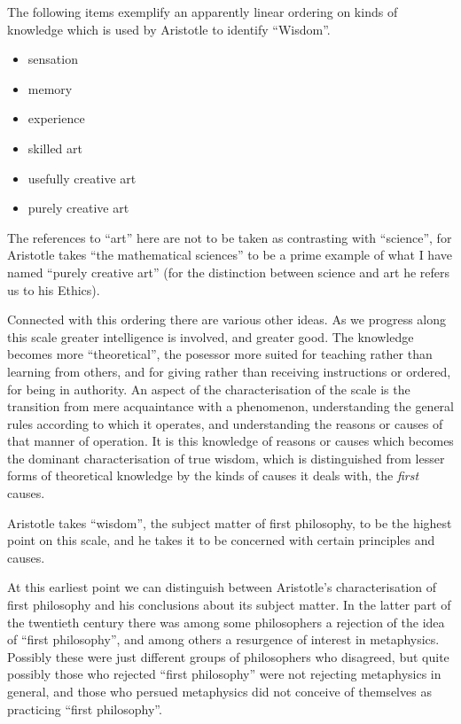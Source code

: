 \documentclass[10pt,titlepage]{article}
\begin{document}
The following items exemplify an apparently linear ordering on kinds of knowledge which is used by Aristotle to identify ``Wisdom''.

\begin{itemize}
\item sensation
\item memory
\item experience
\item skilled art
\item usefully creative art
\item purely creative art
\end{itemize}

The references to ``art'' here are not to be taken as contrasting with ``science'', for Aristotle takes ``the mathematical sciences'' to be a prime example of what I have named ``purely creative art'' (for the distinction between science and art he refers us to his Ethics).

Connected with this ordering there are various other ideas.
As we progress along this scale greater intelligence is involved, and greater good.
The knowledge becomes more ``theoretical'', the posessor more suited for teaching rather than learning from others, and for giving rather than receiving instructions or ordered, for being in authority.
An aspect of the characterisation of the scale is the transition from mere acquaintance with a phenomenon, understanding the general rules according to which it operates, and understanding the reasons or causes of that manner of operation.
It is this knowledge of reasons or causes which becomes the dominant characterisation of true wisdom, which is distinguished from lesser forms of theoretical knowledge by the kinds of causes it deals with, the \emph{first} causes.

Aristotle takes ``wisdom'', the subject matter of first philosophy, to be the highest point on this scale, and he takes it to be concerned with certain principles and causes.

At this earliest point we can distinguish between Aristotle's characterisation of first philosophy and his conclusions about its subject matter.
In the latter part of the twentieth century there was among some philosophers a rejection of the idea of ``first philosophy'', and among others a resurgence of interest in metaphysics.
Possibly these were just different groups of philosophers who disagreed, but quite possibly those who rejected ``first philosophy'' were not rejecting metaphysics in general, and those who persued metaphysics did not conceive of themselves as practicing ``first philosophy''.
\end{document}
